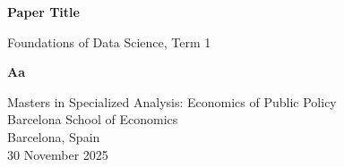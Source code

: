 \documentclass[a4paper, 12pt]{article}
\begin{document}
\begin{titlepage}
   \begin{center}
       \vspace*{1cm}

       \textbf{Paper Title}

       \vspace{0.5cm}
        Foundations of Data Science, Term 1 
            
       \vspace{1.5cm}

       \textbf{Aa}

            
       Masters in Specialized Analysis: Economics of Public Policy \\
       Barcelona School of Economics\\
       Barcelona, Spain\\
       30 November 2025
            
   \end{center}
\end{titlepage}

\pagebreak
\tableofcontents

% 
\end{document}
